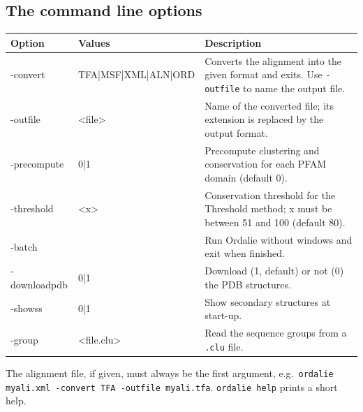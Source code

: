 \documentclass[a4paper]{article}
\begin{document}
\subsection{The command line options}
\label{chap-cmdline}
\begin{center}
\begin{tabular}{|l|l|p{}|}
\hline
\textbf{Option}&\textbf{Values}&\textbf{Description}\\
\hline
\hline
-convert & TFA|MSF|XML|ALN|ORD & Converts the alignment into the given format and exits. Use \texttt{-outfile} to name the output file.\\
-outfile & <file> & Name of the converted file; its extension is replaced by the output format.\\
-precompute & 0|1 & Precompute clustering and conservation for each PFAM domain (default 0).\\
-threshold & <x> & Conservation threshold for the Threshold method; x must be between 51 and 100 (default 80).\\
-batch & & Run Ordalie without windows and exit when finished.\\
-downloadpdb & 0|1 & Download (1, default) or not (0) the PDB structures.\\
-showss & 0|1 & Show secondary structures at start-up.\\
-group & <file.clu> & Read the sequence groups from a \texttt{.clu} file.\\
\hline
\end{tabular}
\end{center}

The alignment file, if given, must always be the first argument, e.g.\ \texttt{ordalie myali.xml -convert TFA -outfile myali.tfa}. \texttt{ordalie help} prints a short help.

\newpage


\end{document}
